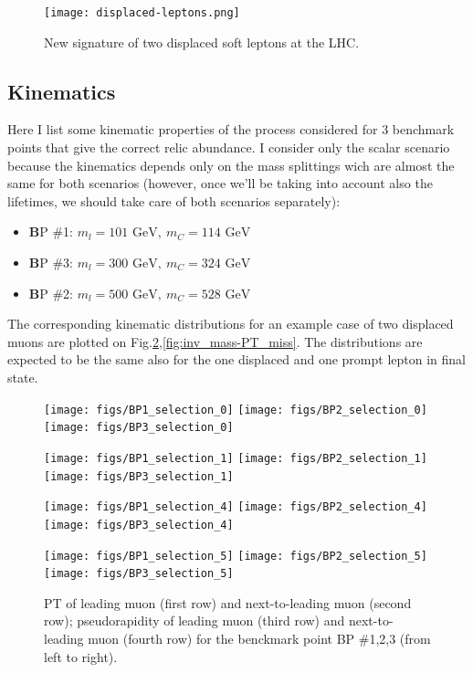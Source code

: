 \documentclass[12pt,letterpaper,notitlepage]{article}
\begin{document}
\begin{figure}[H]
\centering
\texttt{[image: displaced-leptons.png]}
\caption{\label{fig:2displaced_diagram}New signature of two displaced soft leptons at the LHC.}
\end{figure}

\subsection{Kinematics}

Here I list some kinematic properties of the process considered for 3 benchmark points that give the correct relic abundance. I consider only the scalar scenario because the kinematics depends only on the mass splittings wich are almost the same for both scenarios (however, once we'll be taking into account also the lifetimes, we should take care of both scenarios separately):

\begin{itemize}
  \item {\textbf BP \#1}: $m_l = 101 \text{ GeV},\ m_C = 114\text{ GeV}$
  \item {\textbf BP \#3}: $m_l = 300 \text{ GeV},\ m_C = 324 \text{ GeV}$
  \item {\textbf BP \#2}: $m_l = 500 \text{ GeV},\ m_C = 528 \text{ GeV}$
\end{itemize} \label{benchmarks_scalar}

The corresponding kinematic distributions for an example case of two displaced muons are plotted on Fig.\ref{fig:pT-eta},\ref{fig:inv_mass-PT_miss}. The distributions are expected to be the same also for the one displaced and one prompt lepton in final state.

\begin{figure}[H]
\centering

\texttt{[image: figs/BP1\_selection\_0]}
\texttt{[image: figs/BP2\_selection\_0]}
\texttt{[image: figs/BP3\_selection\_0]}

\texttt{[image: figs/BP1\_selection\_1]}
\texttt{[image: figs/BP2\_selection\_1]}
\texttt{[image: figs/BP3\_selection\_1]}

\texttt{[image: figs/BP1\_selection\_4]}
\texttt{[image: figs/BP2\_selection\_4]}
\texttt{[image: figs/BP3\_selection\_4]}

\texttt{[image: figs/BP1\_selection\_5]}
\texttt{[image: figs/BP2\_selection\_5]}
\texttt{[image: figs/BP3\_selection\_5]}


\caption{\label{fig:pT-eta} PT of leading muon (first row) and next-to-leading muon (second row); pseudorapidity of leading muon (third row) and next-to-leading muon (fourth row) for the benckmark point BP \#1,2,3 (from left to right). }
\end{figure}
\end{document}

